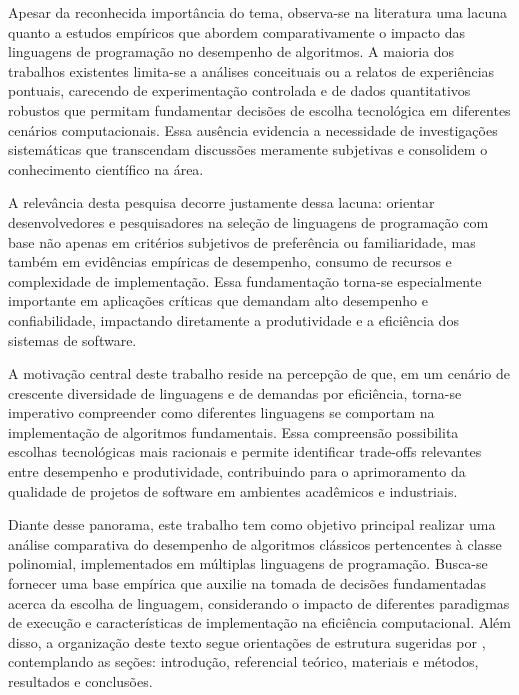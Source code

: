 \documentclass[12pt, a4paper]{article}
\begin{document}
Apesar da reconhecida importância do tema, observa-se na literatura uma lacuna quanto a estudos empíricos que abordem comparativamente o impacto das linguagens de programação no desempenho de algoritmos. A maioria dos trabalhos existentes limita-se a análises conceituais ou a relatos de experiências pontuais, carecendo de experimentação controlada e de dados quantitativos robustos que permitam fundamentar decisões de escolha tecnológica em diferentes cenários computacionais. Essa ausência evidencia a necessidade de investigações sistemáticas que transcendam discussões meramente subjetivas e consolidem o conhecimento científico na área.  

A relevância desta pesquisa decorre justamente dessa lacuna: orientar desenvolvedores e pesquisadores na seleção de linguagens de programação com base não apenas em critérios subjetivos de preferência ou familiaridade, mas também em evidências empíricas de desempenho, consumo de recursos e complexidade de implementação. Essa fundamentação torna-se especialmente importante em aplicações críticas que demandam alto desempenho e confiabilidade, impactando diretamente a produtividade e a eficiência dos sistemas de software.  

A motivação central deste trabalho reside na percepção de que, em um cenário de crescente diversidade de linguagens e de demandas por eficiência, torna-se imperativo compreender como diferentes linguagens se comportam na implementação de algoritmos fundamentais. Essa compreensão possibilita escolhas tecnológicas mais racionais e permite identificar trade-offs relevantes entre desempenho e produtividade, contribuindo para o aprimoramento da qualidade de projetos de software em ambientes acadêmicos e industriais.  

Diante desse panorama, este trabalho tem como objetivo principal realizar uma análise comparativa do desempenho de algoritmos clássicos pertencentes à classe polinomial, implementados em múltiplas linguagens de programação. Busca-se fornecer uma base empírica que auxilie na tomada de decisões fundamentadas acerca da escolha de linguagem, considerando o impacto de diferentes paradigmas de execução e características de implementação na eficiência computacional. Além disso, a organização deste texto segue orientações de estrutura sugeridas por , contemplando as seções: introdução, referencial teórico, materiais e métodos, resultados e conclusões.



\end{document}
